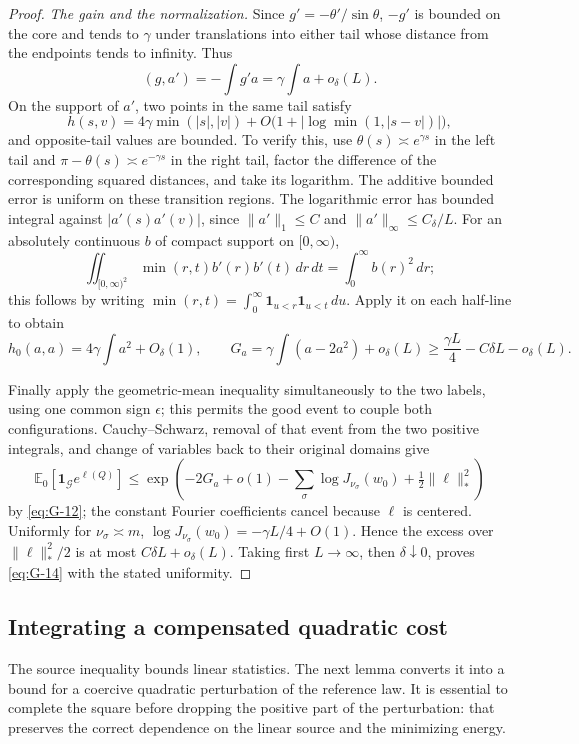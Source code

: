 \begin{proof}
\emph{The gain and the normalization.}
Since \(g'=-\theta'/\sin\theta\),
\(-g'\) is bounded on the core and tends to \(\gamma\) under
translations into either tail whose distance from the endpoints tends
to infinity. Thus
\[
 (g,a')=-\int g'a=\gamma\int a+o_\delta(L).
\]
On the support of \(a'\), two points in the same tail satisfy
\[
 h(s,v)=4\gamma\min(|s|,|v|)
       +O\bigl(1+|\log\min(1,|s-v|)|\bigr),
\]
and opposite-tail values are bounded. To verify this, use
\(\theta(s)\asymp e^{\gamma s}\) in the left tail and
\(\pi-\theta(s)\asymp e^{-\gamma s}\) in the right tail, factor
the difference of the corresponding squared distances, and take its
logarithm. The additive bounded error is uniform on these transition
regions. The logarithmic error has bounded integral against
\(|a'(s)a'(v)|\), since \(\|a'\|_1\le C\) and
\(\|a'\|_\infty\le C_\delta/L\).
For an absolutely continuous \(b\) of compact support on \([0,\infty)\),
\[
 \iint_{[0,\infty)^2}\min(r,t)b'(r)b'(t)\,dr\,dt
       =\int_0^\infty b(r)^2\,dr;
\]
this follows by writing \(\min(r,t)=\int_0^\infty
\mathbf1_{u<r}\mathbf1_{u<t}\,du\). Apply it on each half-line to
obtain
\[
 h_0(a,a)=4\gamma\int a^2+O_\delta(1),\qquad
 G_a=\gamma\int(a-2a^2)+o_\delta(L)
       \ge\frac{\gamma L}{4}-C\delta L-o_\delta(L).
\]

Finally apply the geometric-mean inequality simultaneously to the two
labels, using one common sign \(\epsilon\); this permits the good event
to couple both configurations. Cauchy--Schwarz, removal of that event
from the two positive integrals, and change of variables back to their
original domains give
\[
 \mathbb E_0[\mathbf1_{\mathcal G}e^{\ell(Q)}]
 \le \exp\left(-2G_a+o(1)
             -\sum_\sigma\log J_{\nu_\sigma}(w_0)
             +\tfrac12\|\ell\|_*^2\right)
\]
by \eqref{eq:G-12}; the constant Fourier coefficients cancel because
\(\ell\) is centered. Uniformly for \(\nu_\sigma\asymp m\),
\(\log J_{\nu_\sigma}(w_0)=-\gamma L/4+O(1)\).
Hence the excess over \(\|\ell\|_*^2/2\) is at most
\(C\delta L+o_\delta(L)\). Taking first \(L\to\infty\), then
\(\delta\downarrow0\), proves \eqref{eq:G-14} with the stated uniformity.
\end{proof}
\subsection{Integrating a compensated quadratic cost}

The source inequality bounds linear statistics. The next lemma converts
it into a bound for a coercive quadratic perturbation of the reference
law. It is essential to complete the square before dropping the positive
part of the perturbation: that preserves the correct dependence on the
linear source and the minimizing energy.

